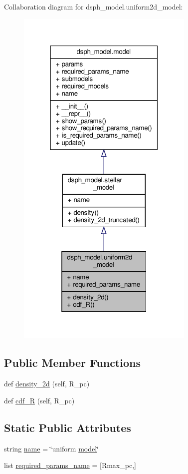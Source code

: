 Collaboration diagram for dsph\+\_\+model.\+uniform2d\+\_\+model\+:\nopagebreak
\begin{figure}[H]
\begin{center}
\leavevmode
\includegraphics[width=241pt]{da/d4e/classdsph__model_1_1uniform2d__model__coll__graph}
\end{center}
\end{figure}
\subsection*{Public Member Functions}
\begin{DoxyCompactItemize}
\item 
def \hyperlink{classdsph__model_1_1uniform2d__model_aff33b4418158947e106a097c3a58a67e}{density\+\_\+2d} (self, R\+\_\+pc)
\item 
def \hyperlink{classdsph__model_1_1uniform2d__model_a2c038957a1031356eb5e011a8644df2d}{cdf\+\_\+R} (self, R\+\_\+pc)
\end{DoxyCompactItemize}
\subsection*{Static Public Attributes}
\begin{DoxyCompactItemize}
\item 
string \hyperlink{classdsph__model_1_1uniform2d__model_a6675f4914587aa9b7e3dcc30fe717b20}{name} = \char`\"{}uniform \hyperlink{classdsph__model_1_1model}{model}\char`\"{}
\item 
list \hyperlink{classdsph__model_1_1uniform2d__model_aa29df7124c2edd32617deddca0271eb7}{required\+\_\+params\+\_\+name} = \mbox{[}\textquotesingle{}Rmax\+\_\+pc\textquotesingle{},\mbox{]}
\end{DoxyCompactItemize}
